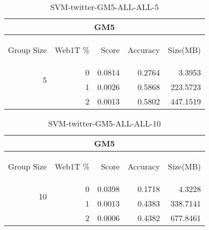 \begin{center}
\begin{table}[htbp] 
 \begin{center}
\begin{tabular}{ | r | r | r | r | r |}
\hline
\multicolumn{5}{|c|}{GM5}\\
\hline
\begin{sideways}Group Size\end{sideways} & \begin{sideways}Web1T \%\end{sideways} & \begin{sideways}Score\end{sideways} & \begin{sideways}Accuracy\end{sideways} & \begin{sideways}Size(MB)\end{sideways}\\
\hline
\multirow{2}{*}{5}
 & 0 & 0.0814 & 0.2764 & 3.3953\\ \cline{2-5}
 & 1 & 0.0026 & 0.5868 & 223.5723\\ \cline{2-5}
 & 2 & 0.0013 & 0.5802 & 447.1519\\ \cline{2-5}
\hline
\end{tabular}
\caption{SVM-twitter-GM5-ALL-ALL-5}
\label{table:SVM-twitter-GM5-ALL-ALL-5}
\end{center}
 \end{table}
\end{center}

\begin{center}
\begin{table}[htbp] 
 \begin{center}
\begin{tabular}{ | r | r | r | r | r |}
\hline
\multicolumn{5}{|c|}{GM5}\\
\hline
\begin{sideways}Group Size\end{sideways} & \begin{sideways}Web1T \%\end{sideways} & \begin{sideways}Score\end{sideways} & \begin{sideways}Accuracy\end{sideways} & \begin{sideways}Size(MB)\end{sideways}\\
\hline
\multirow{2}{*}{10}
 & 0 & 0.0398 & 0.1718 & 4.3228\\ \cline{2-5}
 & 1 & 0.0013 & 0.4383 & 338.7141\\ \cline{2-5}
 & 2 & 0.0006 & 0.4382 & 677.8461\\ \cline{2-5}
\hline
\end{tabular}
\caption{SVM-twitter-GM5-ALL-ALL-10}
\label{table:SVM-twitter-GM5-ALL-ALL-10}
\end{center}
 \end{table}
\end{center}

